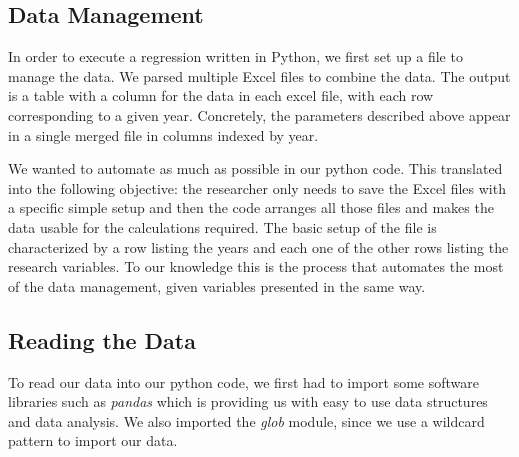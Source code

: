 \documentclass[12pt,a4paper,bibliography=totocnumbered,listof=totocnumbered]{scrartcl}
\begin{document}
\subsection{Data Management}
In order to execute a regression written in Python, we first set up a file to manage the data. We parsed multiple Excel files to combine the data. The output is a table with a column for the data in each excel file, with each row corresponding to a given year. Concretely, the parameters described above appear in a single merged file in columns indexed by year. 

We wanted to automate as much as possible in our python code. This translated into the following objective: the researcher only needs to save the Excel files with a specific simple setup and then the code arranges all those files and makes the data usable for the calculations required. The basic setup of the file is characterized by a row listing the years and each one of the other rows listing the research variables. To our knowledge this is the process that automates the most of the data management, given variables presented in the same way.
\\      
\subsection{Reading the Data}

To read our data into our python code, we first had to import some software libraries such as \textit{pandas} which is providing us with easy to use data structures and data analysis. We also imported the \textit{glob} module, since we use a wildcard pattern to import our data. 
\end{document}

